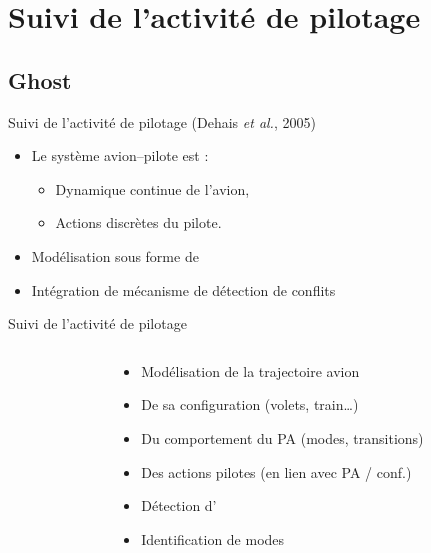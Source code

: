 \documentclass[compress]{beamer}
\begin{document}
\section{Suivi de  l'activité de pilotage}

\begin{frame}
\end{frame}

\subsection{Ghost}
\begin{frame}{Suivi de l'activité de pilotage (Dehais {\it et al.}, 2005)}
\begin{itemize}
\item Le système avion--pilote est  :
	\begin{itemize}
	\item Dynamique continue de l'avion,
	\item Actions discrètes du pilote.
	\end{itemize}
\item Modélisation sous forme de 
\item Intégration de mécanisme de détection de conflits
\end{itemize}
\end{frame}

\begin{frame}{Suivi de l'activité de pilotage}
\begin{columns}
\begin{column}{0.4\linewidth}
	\begin{tikzpicture}[scale=0.8, transform shape, node distance=35pt]
	
	\end{tikzpicture}
\end{column}
\begin{column}{0.6\linewidth}
\begin{itemize}
\item Modélisation de la trajectoire avion
\item De sa configuration (volets, train\dots)
\item Du comportement du PA (modes, transitions)
\item Des actions pilotes (en lien avec PA / conf.)
\end{itemize}
\vspace{1cm}
\begin{itemize}
\item Détection d'
\item Identification de modes 
\end{itemize}
\end{column}
\end{columns}
\end{frame}
\end{document}
